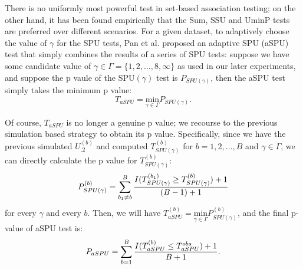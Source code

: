 \documentclass[12pt]{article}
\begin{document}
There is no uniformly most powerful test in set-based association testing; on the other hand, it has been found empirically that the Sum, SSU and UminP tests are preferred over different scenarios. For a given dataset, to adaptively choose the value of $\gamma$ for the SPU tests, Pan et al. \cite{pan2014powerful} proposed an adaptive SPU (aSPU) test that simply combines the results of a series of SPU tests: suppose we have some candidate value of $\gamma \in \Gamma = \{1,2,\ldots,8,\infty \}$ as used in our later experiments, and suppose the p vaule of the SPU$(\gamma)$ test is $P_{ SPU(\gamma) }$, then the aSPU test simply takes the minimum p value: 
$$
T_{aSPU} = \underset{\gamma\in\Gamma}{ \textrm{min} } P_{ SPU(\gamma) }.
$$

Of course, $T_{aSPU}$ is no longer a genuine p value; we recourse to the previous simulation based strategy to obtain its p value. Specifically, since we have the previous simulated $U_{.2}^{ (b) }$ and computed $T^{ (b) }_{ SPU(\gamma) }$ for $b = 1,2,\ldots,B$ and $\gamma \in \Gamma$, we can directly calculate the p value for $T ^ { (b) }_{ SPU(\gamma) }$:
$$
P^{ (b) }_{ SPU(\gamma) } =  \sum_{b_1 \neq b}^B { I(T^{ (b_1) }_{ SPU(\gamma) } \geq T^{ (b) }_{ SPU(\gamma) } ) + 1  \over (B-1) + 1 } 
$$
for every $\gamma$ and every $b$. Then, we will have $ 
T ^ {(b)} _{aSPU} = \underset{\gamma\in\Gamma}{ \textrm{min} } P^{ (b) }_{ SPU(\gamma) }
$, and the final p-value of aSPU test is:
$$
P_{aSPU} = \sum_{b=1}^B { I(T ^ {(b)} _{aSPU} \leq T ^ {obs} _{aSPU} ) + 1  \over B + 1 }.
$$
\end{document}
